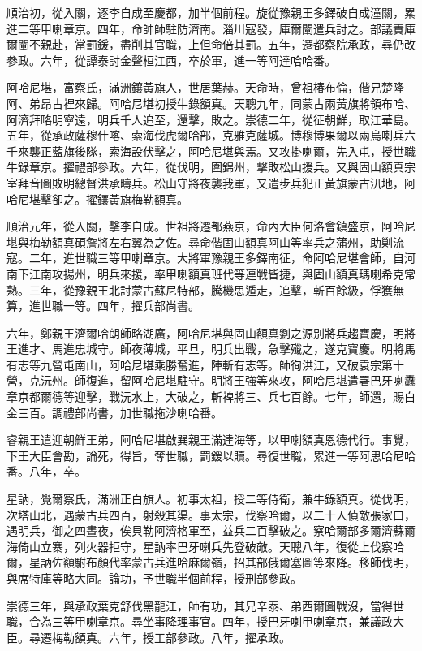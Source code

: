 \begin{pinyinscope}
順治初，從入關，逐李自成至慶都，加半個前程。旋從豫親王多鐸破自成潼關，累進二等甲喇章京。四年，命帥師駐防濟南。淄川寇發，庫爾闡遣兵討之。部議責庫爾闡不親赴，當罰鍰，盡削其官職，上但命倍其罰。五年，遷都察院承政，尋仍改參政。六年，從譚泰討金聲桓江西，卒於軍，進一等阿達哈哈番。

阿哈尼堪，富察氏，滿洲鑲黃旗人，世居葉赫。天命時，曾祖椿布倫，偕兄楚隆阿、弟昂古裡來歸。阿哈尼堪初授牛錄額真。天聰九年，同蒙古兩黃旗將領布哈、阿濟拜略明寧遠，明兵千人追至，還擊，敗之。崇德二年，從征朝鮮，取江華島。五年，從承政薩穆什喀、索海伐虎爾哈部，克雅克薩城。博穆博果爾以兩烏喇兵六千來襲正藍旗後隊，索海設伏擊之，阿哈尼堪與焉。又攻掛喇爾，先入屯，授世職牛錄章京。擢禮部參政。六年，從伐明，圍錦州，擊敗松山援兵。又與固山額真宗室拜音圖敗明總督洪承疇兵。松山守將夜襲我軍，又遣步兵犯正黃旗蒙古汛地，阿哈尼堪擊卻之。擢鑲黃旗梅勒額真。

順治元年，從入關，擊李自成。世祖將遷都燕京，命內大臣何洛會鎮盛京，阿哈尼堪與梅勒額真碩詹將左右翼為之佐。尋命偕固山額真阿山等率兵之蒲州，助剿流寇。二年，進世職三等甲喇章京。大將軍豫親王多鐸南征，命阿哈尼堪會師，自河南下江南攻揚州，明兵來援，率甲喇額真班代等連戰皆捷，與固山額真瑪喇希克常熟。三年，從豫親王北討蒙古蘇尼特部，騰機思遁走，追擊，斬百餘級，俘獲無算，進世職一等。四年，擢兵部尚書。

六年，鄭親王濟爾哈朗師略湖廣，阿哈尼堪與固山額真劉之源別將兵趨寶慶，明將王進才、馬進忠城守。師夜薄城，平旦，明兵出戰，急擊殲之，遂克寶慶。明將馬有志等九營屯南山，阿哈尼堪乘勝奮進，陣斬有志等。師徇洪江，又破袁宗第十營，克沅州。師復進，留阿哈尼堪駐守。明將王強等來攻，阿哈尼堪遣署巴牙喇纛章京都爾德等迎擊，戰沅水上，大破之，斬裨將三、兵七百餘。七年，師還，賜白金三百。調禮部尚書，加世職拖沙喇哈番。

睿親王遣迎朝鮮王弟，阿哈尼堪啟巽親王滿達海等，以甲喇額真恩德代行。事覺，下王大臣會勘，論死，得旨，奪世職，罰鍰以贖。尋復世職，累進一等阿思哈尼哈番。八年，卒。

星訥，覺爾察氏，滿洲正白旗人。初事太祖，授二等侍衛，兼牛錄額真。從伐明，次塔山北，遇蒙古兵四百，射殺其渠。事太宗，伐察哈爾，以二十人偵敵張家口，遇明兵，御之四晝夜，俟貝勒阿濟格軍至，益兵二百擊破之。察哈爾部多爾濟蘇爾海倚山立寨，列火器拒守，星訥率巴牙喇兵先登破敵。天聰八年，復從上伐察哈爾，星訥佐額駙布顏代率蒙古兵進哈麻爾嶺，招其部俄爾塞圖等來降。移師伐明，與席特庫等略大同。論功，予世職半個前程，授刑部參政。

崇德三年，與承政葉克舒伐黑龍江，師有功，其兄辛泰、弟西爾圖戰沒，當得世職，合為三等甲喇章京。尋坐事降理事官。四年，授巴牙喇甲喇章京，兼議政大臣。尋遷梅勒額真。六年，授工部參政。八年，擢承政。


\end{pinyinscope}
